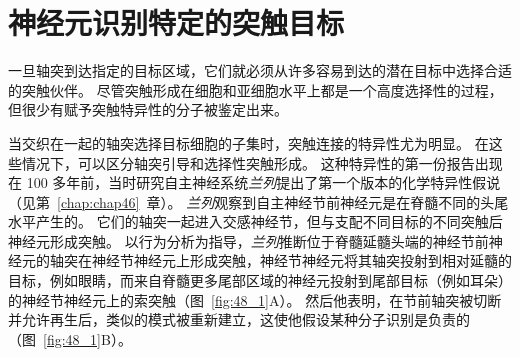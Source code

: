 \section{神经元识别特定的突触目标}

一旦轴突到达指定的目标区域，它们就必须从许多容易到达的潜在目标中选择合适的突触伙伴。
尽管突触形成在细胞和亚细胞水平上都是一个高度选择性的过程，但很少有赋予突触特异性的分子被鉴定出来。


当交织在一起的轴突选择目标细胞的子集时，突触连接的特异性尤为明显。
在这些情况下，可以区分轴突引导和选择性突触形成。
这种特异性的第一份报告出现在 100 多年前，当时研究自主神经系统\textit{兰列}提出了第一个版本的化学特异性假说（见第~\ref{chap:chap46}~章）。
\textit{兰列}观察到自主神经节前神经元是在脊髓不同的头尾水平产生的。
它们的轴突一起进入交感神经节，但与支配不同目标的不同突触后神经元形成突触。
以行为分析为指导，\textit{兰列}推断位于脊髓延髓头端的神经节前神经元的轴突在神经节神经元上形成突触，神经节神经元将其轴突投射到相对延髓的目标，例如眼睛，而来自脊髓更多尾部区域的神经元投射到尾部目标（例如耳朵）的神经节神经元上的索突触（图~\ref{fig:48_1}A）。
然后他表明，在节前轴突被切断并允许再生后，类似的模式被重新建立，这使他假设某种分子识别是负责的（图~\ref{fig:48_1}B）。


